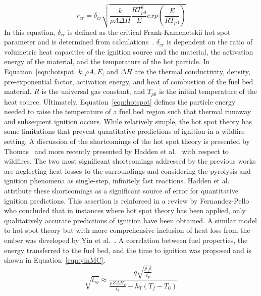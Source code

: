         \begin{equation}
            r_{cr} = \delta_{cr}\sqrt{\frac{k}{\rho A \Delta H}\frac{RT^{2}_{p0}}{E} exp\left(\frac{E}{RT_{p0}}  \right)}
            \label{eqn:hotspot}
        \end{equation}
    In this equation, $\delta_{cr}$ is defined as the critical Frank-Kamenetskii hot spot parameter and is determined from calculations~\cite{Goldshleger1973IgnitionDimensions}. $\delta_{cr}$ is dependent on the ratio of volumetric heat capacities of the ignition source and the material, the activation energy of the material, and the temperature of the hot particle. In Equation~\ref{eqn:hotspot} $k, \rho A, E$, and $\Delta H$ are the thermal conductivity, density, pre-exponential factor, activation energy, and heat of combustion of the fuel bed material. $R$ is the universal gas constant, and $T_{p0}$ is the initial temperature of the heat source. Ultimately, Equation~\ref{eqn:hotspot} defines the particle energy needed to raise the temperature of a fuel bed region such that thermal runaway and subsequent ignition occurs. While relatively simple, the hot spot theory has some limitations that prevent quantitative predictions of ignition in a wildfire setting. A discussion of the shortcomings of the hot spot theory is presented by Thomas~\cite{Thomas1965} and more recently presented by Hadden et al.~\cite{Hadden2011} with respect to wildfires. The two most significant shortcomings addressed by the previous works are neglecting heat losses to the surroundings and considering the pyrolysis and ignition phenomena as single-step, infinitely fast reactions. Hadden et al. attribute these shortcomings as a significant source of error for quantitative ignition predictions. This assertion is reinforced in a review by Fernandez-Pello~\cite{Fernandez-Pello2017} who concluded that in instances where hot spot theory has been applied, only qualitatively accurate predictions of ignition have been obtained. A similar model to hot spot theory but with more comprehensive inclusion of heat loss from the ember was developed by Yin et al.~\cite{Yin2014}. A correlation between fuel properties, the energy transferred to the fuel bed, and the time to ignition was proposed and is shown in Equation~\ref{eqn:yinMC}.
        \begin{equation}
            \sqrt{t_{ig}} \approx \frac{q\sqrt{\frac{\rho_{f}k}{c_{p}}}}{\frac{\rho Z \Delta H_c}{t_b}- h_T(T_f - T_0)}
            \label{eqn:yinMC}
        \end{equation}
